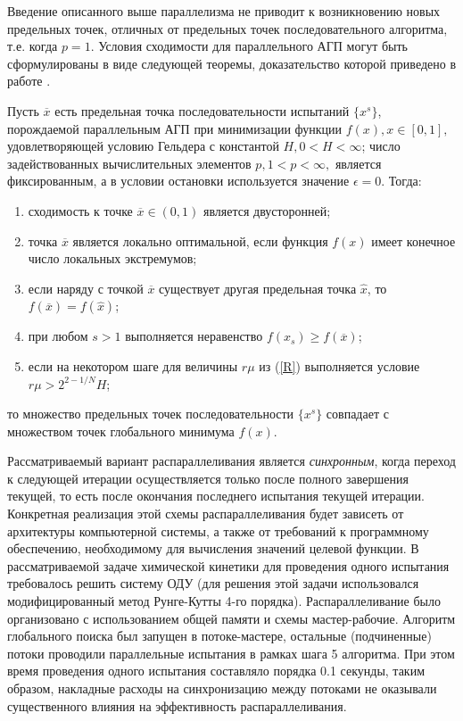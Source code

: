 \documentclass{cmi}
\begin{document}
Введение описанного выше параллелизма не приводит к возникновению новых предельных точек, отличных от предельных точек последовательного алгоритма, т.е. когда $p = 1$. Условия сходимости для параллельного АГП могут быть сформулированы в виде следующей теоремы, доказательство которой приведено в работе \cite{Strongin2000}.

\begin{theorem*}%
	Пусть $\overline{x}$ есть предельная точка последовательности испытаний $\{x^s\}$, порождаемой параллельным АГП при минимизации функции $f(x), x\in [0,1],$ удовлетворяющей условию Гельдера с константой $H, 0<H<\infty$; число задействованных вычислительных элементов $p, 1<p<\infty,$ является фиксированным, а в условии остановки используется значение $\epsilon = 0$. Тогда:
	\begin{enumerate}
		\item
		сходимость к точке $\overline{x} \in (0,1) $ является двусторонней;
		\item
		точка $\overline{x}$ является локально оптимальной, если функция $f(x)$ имеет конечное число локальных экстремумов;
		\item
		если наряду с точкой $\overline{x}$ существует другая предельная точка $\widehat{x}$, то $f(\overline{x})=f(\widehat{x})$;
		\item
		при любом $s>1$ выполняется неравенство $f(x_s) \geq f(\overline{x})$;
		\item
		если на некотором шаге для величины $r\mu$ из (\ref{R}) выполняется условие $r\mu > 2^{2-1/N}H$;
	\end{enumerate}
	то множество предельных точек последовательности $\{x^s\}$ совпадает с множеством точек глобального минимума $f(x)$.
\end{theorem*}

Рассматриваемый вариант распараллеливания является \textit{синхронным}, когда переход к следующей итерации осуществляется только после полного завершения текущей, то есть после окончания последнего испытания текущей итерации. 
Конкретная реализация этой схемы распараллеливания будет зависеть от архитектуры компьютерной системы, а также от требований к программному обеспечению, необходимому для вычисления значений целевой функции. 
В рассматриваемой задаче химической кинетики для проведения одного испытания требовалось решить систему ОДУ (для решения этой задачи использовался модифицированный метод Рунге-Кутты 4-го порядка). Распараллеливание было организовано с использованием общей памяти и схемы мастер-рабочие. Алгоритм глобального поиска был запущен в потоке-мастере, остальные (подчиненные) потоки проводили параллельные испытания в рамках шага 5 алгоритма. При этом время проведения одного испытания составляло порядка 0.1 секунды, таким образом, накладные расходы на синхронизацию между потоками не оказывали существенного влияния на эффективность распараллеливания.
\end{document}
